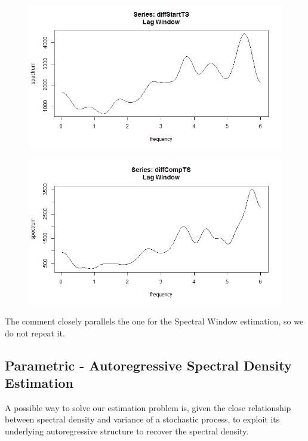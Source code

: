 \documentclass[12pt]{article} %
\begin{document}
\begin{figure}[h!]
\begin{center}
\includegraphics[scale=0.5]{lagstart}
\caption{}
\end{center}
\end{figure}

\begin{figure}[h!]
\begin{center}
\includegraphics[scale=0.5]{lagcomp}
\caption{}
\end{center}
\end{figure}

The comment closely parallels the one for the Spectral Window estimation, so we do not repeat it.

\subsection{Parametric - Autoregressive Spectral Density Estimation}

A possible way to solve our estimation problem is, given the close relationship between spectral density and variance of a stochastic process, to exploit its underlying autoregressive structure to recover the spectral density. 
\end{document}
